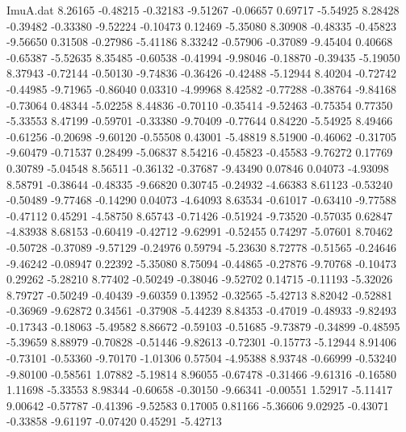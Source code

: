 \begin{filecontents}{ImuA.dat}
   8.26165   -0.48215   -0.32183   -9.51267   -0.06657    0.69717   -5.54925
   8.28428   -0.39482   -0.33380   -9.52224   -0.10473    0.12469   -5.35080
   8.30908   -0.48335   -0.45823   -9.56650    0.31508   -0.27986   -5.41186
   8.33242   -0.57906   -0.37089   -9.45404    0.40668   -0.65387   -5.52635
   8.35485   -0.60538   -0.41994   -9.98046   -0.18870   -0.39435   -5.19050
   8.37943   -0.72144   -0.50130   -9.74836   -0.36426   -0.42488   -5.12944
   8.40204   -0.72742   -0.44985   -9.71965   -0.86040    0.03310   -4.99968
   8.42582   -0.77288   -0.38764   -9.84168   -0.73064    0.48344   -5.02258
   8.44836   -0.70110   -0.35414   -9.52463   -0.75354    0.77350   -5.33553
   8.47199   -0.59701   -0.33380   -9.70409   -0.77644    0.84220   -5.54925
   8.49466   -0.61256   -0.20698   -9.60120   -0.55508    0.43001   -5.48819
   8.51900   -0.46062   -0.31705   -9.60479   -0.71537    0.28499   -5.06837
   8.54216   -0.45823   -0.45583   -9.76272    0.17769    0.30789   -5.04548
   8.56511   -0.36132   -0.37687   -9.43490    0.07846    0.04073   -4.93098
   8.58791   -0.38644   -0.48335   -9.66820    0.30745   -0.24932   -4.66383
   8.61123   -0.53240   -0.50489   -9.77468   -0.14290    0.04073   -4.64093
   8.63534   -0.61017   -0.63410   -9.77588   -0.47112    0.45291   -4.58750
   8.65743   -0.71426   -0.51924   -9.73520   -0.57035    0.62847   -4.83938
   8.68153   -0.60419   -0.42712   -9.62991   -0.52455    0.74297   -5.07601
   8.70462   -0.50728   -0.37089   -9.57129   -0.24976    0.59794   -5.23630
   8.72778   -0.51565   -0.24646   -9.46242   -0.08947    0.22392   -5.35080
   8.75094   -0.44865   -0.27876   -9.70768   -0.10473    0.29262   -5.28210
   8.77402   -0.50249   -0.38046   -9.52702    0.14715   -0.11193   -5.32026
   8.79727   -0.50249   -0.40439   -9.60359    0.13952   -0.32565   -5.42713
   8.82042   -0.52881   -0.36969   -9.62872    0.34561   -0.37908   -5.44239
   8.84353   -0.47019   -0.48933   -9.82493   -0.17343   -0.18063   -5.49582
   8.86672   -0.59103   -0.51685   -9.73879   -0.34899   -0.48595   -5.39659
   8.88979   -0.70828   -0.51446   -9.82613   -0.72301   -0.15773   -5.12944
   8.91406   -0.73101   -0.53360   -9.70170   -1.01306    0.57504   -4.95388
   8.93748   -0.66999   -0.53240   -9.80100   -0.58561    1.07882   -5.19814
   8.96055   -0.67478   -0.31466   -9.61316   -0.16580    1.11698   -5.33553
   8.98344   -0.60658   -0.30150   -9.66341   -0.00551    1.52917   -5.11417
   9.00642   -0.57787   -0.41396   -9.52583    0.17005    0.81166   -5.36606
   9.02925   -0.43071   -0.33858   -9.61197   -0.07420    0.45291   -5.42713

\end{filecontents}
